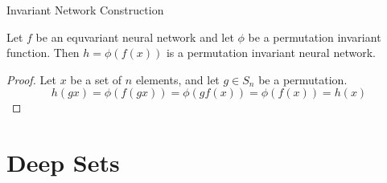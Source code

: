 \documentclass{beamer}
\begin{document}
\begin{frame}{Invariant Network Construction}
    \begin{theorem}
        Let $f$ be an equvariant neural network and let $\phi$ be a permutation invariant function. Then $h = \phi(f(x))$ is a permutation invariant neural network.
    \end{theorem}
    \pause
    \begin{proof}
        Let $x$ be a set of $n$ elements, and let $g \in S_n$ be a permutation.
        \pause
        \[ h(gx) = \phi(f(gx)) = \phi(gf(x)) = \phi(f(x)) = h(x) \]
    \end{proof}
\end{frame}


\section{Deep Sets}
\end{document}
